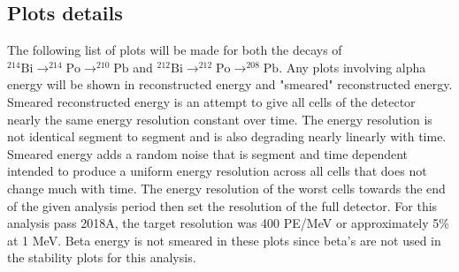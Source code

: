 \subsection{Plots details}
The following list of plots will be made for both the decays of $^{214}\textrm{Bi}\rightarrow^{214}\textrm{Po}\rightarrow^{210}\textrm{Pb}$ and $^{212}\textrm{Bi}\rightarrow^{212}\textrm{Po}\rightarrow^{208}\textrm{Pb}$. Any plots involving alpha energy will be shown in reconstructed energy and "smeared" reconstructed energy. Smeared reconstructed energy is an attempt to give all cells of the detector nearly the same energy resolution constant over time. The energy resolution is not identical segment to segment and is also degrading nearly linearly with time. Smeared energy adds a random noise that is segment and time dependent intended to produce a uniform energy resolution across all cells that does not change much with time. The energy resolution of the worst cells towards the end of the given analysis period then set the resolution of the full detector. For this analysis pass 2018A, the target resolution was 400 PE/MeV or approximately 5\% at 1 MeV. Beta energy is not smeared in these plots since beta's are not used in the stability plots for this analysis.
